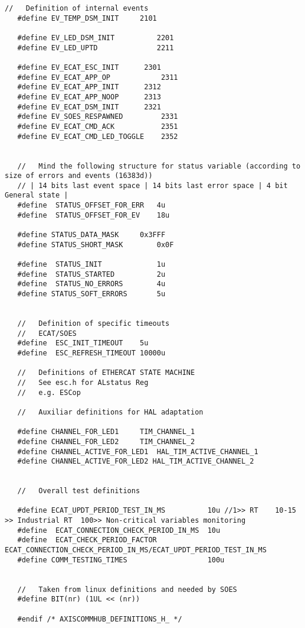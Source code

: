 \begin{lstlisting}[label=lst:definitions,caption={Main definition and configuration header file.}]
   //	Definition of internal events
   #define EV_TEMP_DSM_INIT	 	2101
   
   #define EV_LED_DSM_INIT		 	2201
   #define EV_LED_UPTD			 	2211
   
   #define EV_ECAT_ESC_INIT		 2301
   #define EV_ECAT_APP_OP			 2311
   #define EV_ECAT_APP_INIT		 2312
   #define EV_ECAT_APP_NOOP		 2313
   #define EV_ECAT_DSM_INIT		 2321
   #define EV_SOES_RESPAWNED		 2331
   #define EV_ECAT_CMD_ACK			 2351
   #define EV_ECAT_CMD_LED_TOGGLE	 2352
   
   
   // 	Mind the following structure for status variable (according to size of errors and events (16383d))
   // | 14 bits last event space | 14 bits last error space | 4 bit General state |
   #define	STATUS_OFFSET_FOR_ERR	4u
   #define	STATUS_OFFSET_FOR_EV	18u
   
   #define STATUS_DATA_MASK		0x3FFF
   #define STATUS_SHORT_MASK		0x0F
   
   #define	STATUS_INIT				1u
   #define	STATUS_STARTED			2u
   #define	STATUS_NO_ERRORS		4u
   #define STATUS_SOFT_ERRORS		5u
   
   
   //	Definition of specific timeouts
   //	ECAT/SOES
   #define	ESC_INIT_TIMEOUT	5u
   #define	ESC_REFRESH_TIMEOUT	10000u
   
   //	Definitions of ETHERCAT STATE MACHINE
   //	See esc.h for ALstatus Reg
   //	e.g. ESCop
   
   //	Auxiliar definitions for HAL adaptation
   
   #define CHANNEL_FOR_LED1		TIM_CHANNEL_1
   #define CHANNEL_FOR_LED2		TIM_CHANNEL_2
   #define CHANNEL_ACTIVE_FOR_LED1	HAL_TIM_ACTIVE_CHANNEL_1
   #define CHANNEL_ACTIVE_FOR_LED2 HAL_TIM_ACTIVE_CHANNEL_2
   
   
   //	Overall test definitions
   
   #define ECAT_UPDT_PERIOD_TEST_IN_MS			10u	//1>> RT	10-15 >> Industrial RT 	100>> Non-critical variables monitoring
   #define	ECAT_CONNECTION_CHECK_PERIOD_IN_MS	10u
   #define	ECAT_CHECK_PERIOD_FACTOR			ECAT_CONNECTION_CHECK_PERIOD_IN_MS/ECAT_UPDT_PERIOD_TEST_IN_MS
   #define COMM_TESTING_TIMES					100u
   
   
   //	Taken from linux definitions and needed by SOES
   #define BIT(nr) (1UL << (nr))
   
   #endif /* AXISCOMMHUB_DEFINITIONS_H_ */
   

\end{lstlisting}

